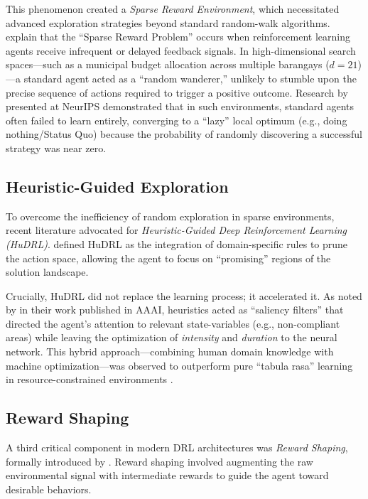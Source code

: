 This phenomenon created a \textit{Sparse Reward Environment}, which necessitated advanced exploration strategies beyond standard random-walk algorithms. \citet{SuttonBarto2018} explain that the ``Sparse Reward Problem'' occurs when reinforcement learning agents receive infrequent or delayed feedback signals. In high-dimensional search spaces—such as a municipal budget allocation across multiple barangays ($d=21$)—a standard agent acted as a ``random wanderer,'' unlikely to stumble upon the precise sequence of actions required to trigger a positive outcome. Research by \cite{Andrychowicz2017} presented at NeurIPS demonstrated that in such environments, standard agents often failed to learn entirely, converging to a ``lazy'' local optimum (e.g., doing nothing/Status Quo) because the probability of randomly discovering a successful strategy was near zero.

\subsection{Heuristic-Guided Exploration}
\label{subsec:hurl}

To overcome the inefficiency of random exploration in sparse environments, recent literature advocated for \textit{Heuristic-Guided Deep Reinforcement Learning (HuDRL)}. \cite{Cheng2021} defined HuDRL as the integration of domain-specific rules to prune the action space, allowing the agent to focus on ``promising'' regions of the solution landscape.

Crucially, HuDRL did not replace the learning process; it accelerated it. As noted by \cite{Vecerik2018} in their work published in AAAI, heuristics acted as ``saliency filters'' that directed the agent's attention to relevant state-variables (e.g., non-compliant areas) while leaving the optimization of \textit{intensity} and \textit{duration} to the neural network. This hybrid approach—combining human domain knowledge with machine optimization—was observed to outperform pure ``tabula rasa'' learning in resource-constrained environments \citep{Nair2018}. 

\subsection{Reward Shaping}
\label{subsec:reward_shaping_rrl}

A third critical component in modern DRL architectures was \textit{Reward Shaping}, formally introduced by \cite{Ng1999}. Reward shaping involved augmenting the raw environmental signal with intermediate rewards to guide the agent toward desirable behaviors.

